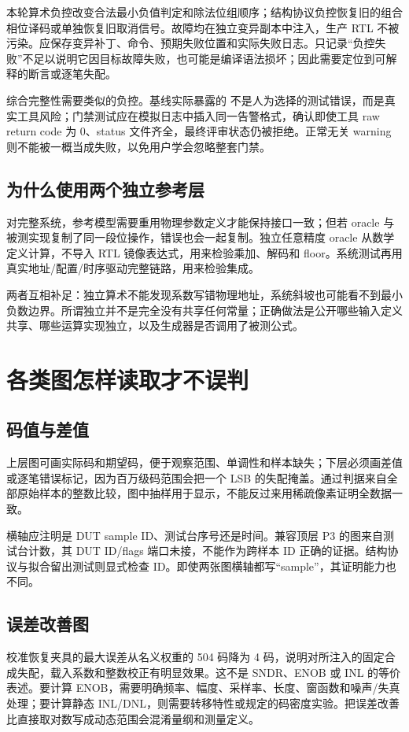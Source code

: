 本轮算术负控改变合法最小负值判定和除法位组顺序；结构协议负控恢复旧的组合相位译码或单独恢复旧取消信号。故障均在独立变异副本中注入，生产 RTL 不被污染。应保存变异补丁、命令、预期失败位置和实际失败日志。只记录“负控失败”不足以说明它因目标故障失败，也可能是编译语法损坏；因此需要定位到可解释的断言或逐笔失配。

综合完整性需要类似的负控。基线实际暴露的  不是人为选择的测试错误，而是真实工具风险；门禁测试应在模拟日志中插入同一告警格式，确认即使工具 raw return code 为 0、status 文件齐全，最终评审状态仍被拒绝。正常无关 warning 则不能被一概当成失败，以免用户学会忽略整套门禁。

\subsection{为什么使用两个独立参考层}
对完整系统，参考模型需要重用物理参数定义才能保持接口一致；但若 oracle 与被测实现复制了同一段位操作，错误也会一起复制。独立任意精度 oracle 从数学定义计算，不导入 RTL 镜像表达式，用来检验乘加、解码和 floor。系统测试再用真实地址/配置/时序驱动完整链路，用来检验集成。

两者互相补足：独立算术不能发现系数写错物理地址，系统斜坡也可能看不到最小负数边界。所谓独立并不是完全没有共享任何常量；正确做法是公开哪些输入定义共享、哪些运算实现独立，以及生成器是否调用了被测公式。

\section{各类图怎样读取才不误判}
\subsection{码值与差值}
上层图可画实际码和期望码，便于观察范围、单调性和样本缺失；下层必须画差值或逐笔错误标记，因为百万级码范围会把一个 LSB 的失配掩盖。通过判据来自全部原始样本的整数比较，图中抽样用于显示，不能反过来用稀疏像素证明全数据一致。

横轴应注明是 DUT sample ID、测试台序号还是时间。兼容顶层 P3 的图来自测试台计数，其 DUT ID/flags 端口未接，不能作为跨样本 ID 正确的证据。结构协议与拟合留出测试则显式检查 ID。即使两张图横轴都写“sample”，其证明能力也不同。

\subsection{误差改善图}
校准恢复夹具的最大误差从名义权重的 504 码降为 4 码，说明对所注入的固定合成失配，载入系数和整数校正有明显效果。这不是 SNDR、ENOB 或 INL 的等价表述。要计算 ENOB，需要明确频率、幅度、采样率、长度、窗函数和噪声/失真处理；要计算静态 INL/DNL，则需要转移特性或规定的码密度实验。把误差改善比直接取对数写成动态范围会混淆量纲和测量定义。

